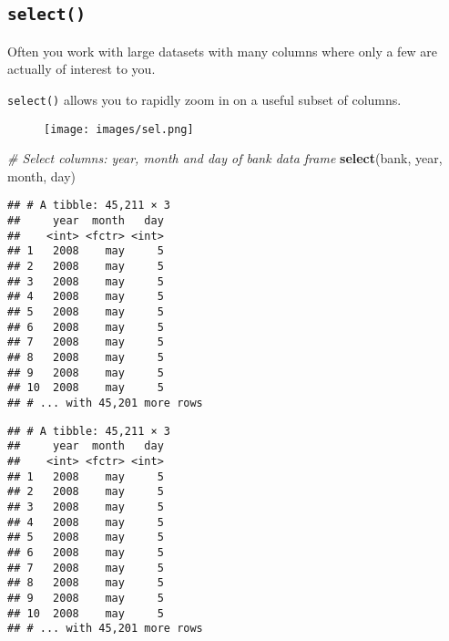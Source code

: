 \documentclass[]{book}
\newenvironment{Shaded}{\begin{snugshade}}{\end{snugshade}}
\newcommand{\KeywordTok}[1]{\textcolor[rgb]{0.13,0.29,0.53}{\textbf{{#1}}}}
\newcommand{\StringTok}[1]{\textcolor[rgb]{0.31,0.60,0.02}{{#1}}}
\newcommand{\CommentTok}[1]{\textcolor[rgb]{0.56,0.35,0.01}{\textit{{#1}}}}
\newcommand{\NormalTok}[1]{{#1}}
\begin{document}
\subsection{\texorpdfstring{\texttt{select()}}{select()}}\label{select}

Often you work with large datasets with many columns where only a few
are actually of interest to you.

\texttt{select()} allows you to rapidly zoom in on a useful subset of
columns.

\begin{figure}[htbp]
\centering
\texttt{[image: images/sel.png]}
\caption{}
\end{figure}

\begin{Shaded}
\begin{Highlighting}[]
\CommentTok{# Select columns: year, month and day of bank data frame}
\KeywordTok{select}\NormalTok{(bank, year, month, day)}
\end{Highlighting}
\end{Shaded}

\begin{verbatim}
## # A tibble: 45,211 × 3
##     year  month   day
##    <int> <fctr> <int>
## 1   2008    may     5
## 2   2008    may     5
## 3   2008    may     5
## 4   2008    may     5
## 5   2008    may     5
## 6   2008    may     5
## 7   2008    may     5
## 8   2008    may     5
## 9   2008    may     5
## 10  2008    may     5
## # ... with 45,201 more rows
\end{verbatim}

\begin{Shaded}
\end{Shaded}

\begin{verbatim}
## # A tibble: 45,211 × 3
##     year  month   day
##    <int> <fctr> <int>
## 1   2008    may     5
## 2   2008    may     5
## 3   2008    may     5
## 4   2008    may     5
## 5   2008    may     5
## 6   2008    may     5
## 7   2008    may     5
## 8   2008    may     5
## 9   2008    may     5
## 10  2008    may     5
## # ... with 45,201 more rows
\end{verbatim}

\begin{Shaded}
\end{Shaded}
\end{document}
